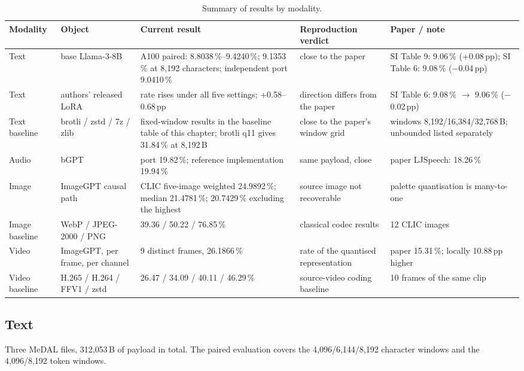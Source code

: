 \documentclass[12pt,a4paper]{article}
\begin{document}
\begin{table}[htbp]\centering\small
\caption{Summary of results by modality.}
\begin{tabular}{@{}p{1.5cm}p{2.5cm}p{4.2cm}p{2.4cm}p{3.0cm}@{}}
\toprule
Modality & Object & Current result & Reproduction verdict & Paper / note \\
\midrule
Text & base Llama-3-8B & A100 paired: 8.8038\,\%--9.4240\,\%; 9.1353\,\% at 8{,}192 characters; independent port 9.0410\,\% & close to the paper & SI Table 9: 9.06\,\% (+0.08\,pp); SI Table 6: 9.08\,\% ($-$0.04\,pp) \\
Text & authors' released LoRA & rate rises under all five settings; +0.58--0.68\,pp & direction differs from the paper & SI Table 6: 9.08\,\% $\rightarrow$ 9.06\,\% ($-$0.02\,pp) \\
Text baseline & brotli / zstd / 7z / zlib & fixed-window results in the baseline table of this chapter; brotli q11 gives 31.84\,\% at 8{,}192\,B & close to the paper's window grid & windows 8{,}192/16{,}384/32{,}768\,B; unbounded listed separately \\
Audio & bGPT & port 19.82\,\%; reference implementation 19.94\,\% & same payload, close & paper LJSpeech: 18.26\,\% \\
Image & ImageGPT causal path & CLIC five-image weighted 24.9892\,\%; median 21.4781\,\%; 20.7429\,\% excluding the highest & source image not recoverable & palette quantisation is many-to-one \\
Image baseline & WebP / JPEG-2000 / PNG & 39.36 / 50.22 / 76.85\,\% & classical codec results & 12 CLIC images \\
Video & ImageGPT, per frame, per channel & 9 distinct frames, 26.1866\,\% & rate of the quantised representation & paper 15.31\,\%; locally 10.88\,pp higher \\
Video baseline & H.265 / H.264 / FFV1 / zstd & 26.47 / 34.09 / 40.11 / 46.29\,\% & source-video coding baseline & 10 frames of the same clip \\
\bottomrule
\end{tabular}
\end{table}

\subsection{Text}

Three MeDAL files, 312{,}053\,B of payload in total. The paired evaluation covers the
4{,}096/6{,}144/8{,}192 character windows and the 4{,}096/8{,}192 token windows.
\end{document}
